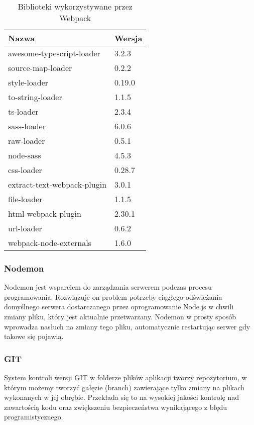 \documentclass[eng,printmode]{mgr}
\begin{document}
\begin{table}[H]
\begin{tabularx}{\textwidth}{|X|X|}
   \hline
    \textbf{Nazwa} & \textbf{Wersja} \\
   \hline
     awesome-typescript-loader & 3.2.3 \\
   \hline
     source-map-loader & 0.2.2 \\
   \hline
     style-loader & 0.19.0 \\
   \hline
  	 to-string-loader & 1.1.5 \\
   \hline
   	 ts-loader & 2.3.4 \\
   \hline
   	 sass-loader & 6.0.6 \\
   \hline
   	 raw-loader & 0.5.1 \\
   \hline
   	 node-sass & 4.5.3 \\
   \hline
   	 css-loader & 0.28.7 \\
   \hline
     extract-text-webpack-plugin & 3.0.1 \\
   \hline
     file-loader & 1.1.5 \\
   \hline
     html-webpack-plugin & 2.30.1 \\
   \hline
     url-loader & 0.6.2 \\
   \hline
     webpack-node-externals & 1.6.0 \\
   \hline
\end{tabularx}
\caption{Biblioteki wykorzystywane przez Webpack}
\end{table}
   
\subsubsection{Nodemon}
Nodemon \cite {Nodemon} jest wsparciem do zarządzania serwerem podczas procesu programowania. Rozwiązuje on problem potrzeby ciągłego odświeżania domyślnego serwera dostarczanego przez oprogramowanie Node.js w chwili zmiany pliku, który jest aktualnie przetwarzany. Nodemon w prosty sposób wprowadza nasłuch na zmiany tego pliku, automatycznie restartując serwer gdy takowe się pojawią.

\subsubsection{GIT}
System kontroli wersji GIT \cite {GIT} w folderze plików aplikacji tworzy repozytorium, w którym możemy tworzyć gałęzie (branch) zawierające tylko zmiany na plikach wykonanych w jej obrębie. Przekłada się to na wysokiej jakości kontrolę nad zawartością kodu oraz zwiększeniu bezpieczeństwa wynikającego z błędu programistycznego. 
\end{document}
